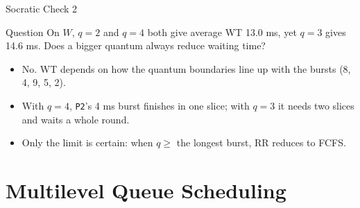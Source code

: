 \documentclass[aspectratio=169]{beamer}
\begin{document}
\begin{frame}{Socratic Check 2}
  \begin{block}{Question}
    On $W$, $q=2$ and $q=4$ both give average WT 13.0 ms, yet $q=3$ gives
    14.6 ms. Does a bigger quantum always reduce waiting time?
  \end{block}
  \vspace{0.25cm}
  \begin{itemize}
    \item No. WT depends on how the quantum boundaries line up with the
      bursts (8, 4, 9, 5, 2).
    \item With $q=4$, \texttt{P2}'s 4 ms burst finishes in one slice; with
      $q=3$ it needs two slices and waits a whole round.
    \item Only the limit is certain: when $q \ge$ the longest burst, RR
      reduces to FCFS.
  \end{itemize}
\end{frame}


\section{Multilevel Queue Scheduling}
\end{document}
